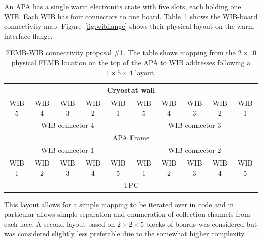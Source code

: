 \documentclass[pdftex,12pt,letter]{article}
\begin{document}
An APA has a single warm electronics crate with five slots, each
holding one WIB.  Each WIB has four connectors to one board.
Table~\ref{tab:femb-wib-1} shows the WIB-board connectivity map.
Figure~\ref{fig:wibflange} shows their physical layout on the warm
interface flange.  

\begin{table}[htp]
  \label{tab:femb-wib-1}
  \centering
  \begin{tabular}[h]{|c|c|c|c|c|c|c|c|c|c|}
    \hline
    \multicolumn{10}{|c|}{Cryostat wall} \\
    \hline
    WIB 5 & WIB 4 & WIB 3 & WIB 2 & WIB 1 & WIB 5 & WIB 4 & WIB 3 & WIB 2 & WIB 1 \\
    \multicolumn{5}{|c|}{WIB connector 4} & \multicolumn{5}{c|}{WIB connector 3} \\
    \hline
    \multicolumn{10}{|c|}{APA Frame} \\
    \hline
    \multicolumn{5}{|c|}{WIB connector 1} & \multicolumn{5}{c|}{WIB connector 2} \\
    WIB 1 & WIB 2 & WIB 3 & WIB 4 & WIB 5 & WIB 1 & WIB 2 & WIB 3 & WIB 4 & WIB 5\\
    \hline
    \multicolumn{10}{|c|}{TPC} \\
    \hline
  \end{tabular}
  \caption{FEMB-WIB connectivity proposal \#1.  The table shows mapping from the $2\times10$ physical FEMB location on the top of the APA to WIB addresses following a $1\times5\times4$ layout.}
\end{table}

This layout allows for a simple mapping to be iterated over in code
and in particular allows simple separation and enumeration of
collection channels from each face.  A second layout based on
$2 \times 2 \times 5$ blocks of boards was considered but was
considered slightly less preferable due to the somewhat higher
complexity.
\end{document}
